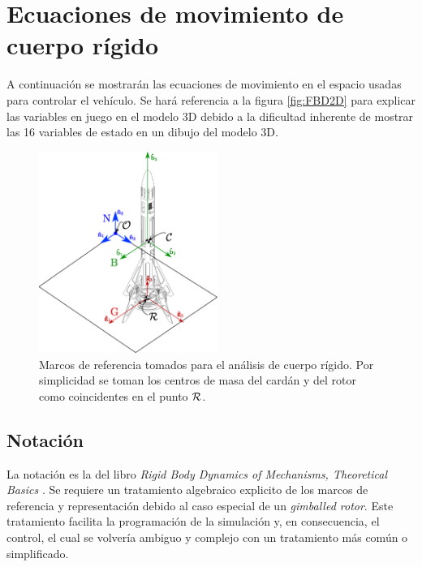 
\section{Ecuaciones de movimiento de cuerpo rígido} \label{sec:ecuacionesRigid}
A continuación se mostrarán las ecuaciones de movimiento en el espacio usadas para controlar el vehículo.
Se hará referencia a la figura \ref{fig:FBD2D} para explicar las variables en juego en el modelo 3D debido a la dificultad inherente de mostrar las 16 variables de estado en un dibujo del modelo 3D.

\begin{figure}[htb!]
	\centering
	\includegraphics[width=0.52\textwidth]{fig/marcosDiagrama.eps}
	\caption{Marcos de referencia tomados para el análisis de cuerpo rígido. Por simplicidad se toman los centros de masa del cardán y del rotor como coincidentes en el punto $\mathcal{R}$.}
\end{figure}

\newpage
\subsection{Notación}

La notación es la del libro \textit{Rigid Body Dynamics of Mechanisms, Theoretical Basics} \cite{hahn2013rigid}. Se requiere un tratamiento algebraico explicito de los marcos de referencia y representación debido al caso especial de un \textit{gimballed rotor}. Este tratamiento facilita la programación de la simulación y, en consecuencia, el control, el cual se volvería ambiguo y complejo con un tratamiento más común o simplificado.

